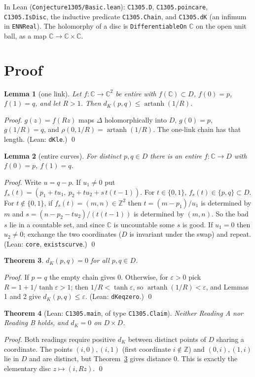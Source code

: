 \documentclass[11pt]{article}
\newtheorem{theorem}{Theorem}
\newtheorem{lemma}[theorem]{Lemma}
\theoremstyle{definition}
\renewcommand{\_}{\oldus\allowbreak}
\newcommand{\C}{\mathbb{C}}
\newcommand{\Z}{\mathbb{Z}}
\begin{document}
In Lean (\texttt{Conjecture1305/Basic.lean}): \texttt{C1305.D}, \texttt{C1305.poincare}, \texttt{C1305.IsDisc},
the inductive predicate \texttt{C1305.Chain}, and \texttt{C1305.dK} (an infimum in \texttt{ENNReal}). The
holomorphy of a disc is \texttt{DifferentiableOn} $\C$ on the open unit ball, as a map $\C\to\C\times\C$.

\section{Proof}

\begin{lemma}[one link] Let $f:\C\to\C^2$ be entire with $f(\C)\subset D$, $f(0)=p$, $f(1)=q$, and let $R>1$. Then
$d_K(p,q)\le\operatorname{artanh}(1/R)$.
\end{lemma}
\emph{Proof.} $g(z)=f(Rz)$ maps $\Delta$ holomorphically into $D$, $g(0)=p$, $g(1/R)=q$, and
$\rho(0,1/R)=\operatorname{artanh}(1/R)$. The one-link chain has that length. (Lean: \texttt{dK\_le}.) \qed

\begin{lemma}[entire curves] For distinct $p,q\in D$ there is an entire $f:\C\to D$ with $f(0)=p$, $f(1)=q$.
\end{lemma}
\emph{Proof.} Write $u=q-p$. If $u_1\ne0$ put
$f_s(t)=(p_1+tu_1,\ p_2+tu_2+s\,t(t-1))$. For $t\in\{0,1\}$, $f_s(t)\in\{p,q\}\subset D$. For $t\notin\{0,1\}$, if
$f_s(t)=(m,n)\in\Z^2$ then $t=(m-p_1)/u_1$ is determined by $m$ and $s=(n-p_2-tu_2)/(t(t-1))$ is determined by
$(m,n)$. So the bad $s$ lie in a countable set, and since $\C$ is uncountable some $s$ is good. If $u_1=0$ then
$u_2\ne0$; exchange the two coordinates ($D$ is invariant under the swap) and repeat. (Lean: \texttt{core},
\texttt{exists\_curve}.) \qed

\begin{theorem}\label{thm:zero} $d_K(p,q)=0$ for all $p,q\in D$.
\end{theorem}
\emph{Proof.} If $p=q$ the empty chain gives $0$. Otherwise, for $\varepsilon>0$ pick $R=1+1/\tanh\varepsilon>1$;
then $1/R<\tanh\varepsilon$, so $\operatorname{artanh}(1/R)<\varepsilon$, and Lemmas 1 and 2 give
$d_K(p,q)\le\varepsilon$. (Lean: \texttt{dK\_eq\_zero}.) \qed

\begin{theorem}[Lean: \texttt{C1305.main}, of type \texttt{C1305.Claim}] Neither Reading A nor Reading B holds,
and $d_K=0$ on $D\times D$.
\end{theorem}
\emph{Proof.} Both readings require positive $d_K$ between distinct points of $D$ sharing a coordinate. The points
$(i,0),(i,1)$ (first coordinate $i\notin\Z$) and $(0,i),(1,i)$ lie in $D$ and are distinct, but Theorem~\ref{thm:zero}
gives distance $0$. This is exactly the elementary disc $z\mapsto(i,Rz)$. \qed
\end{document}
